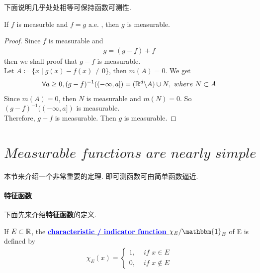 	\vspace{2em}
	下面说明几乎处处相等可保持函数可测性.
	\begin{proposition}
		If $f$ is measurble and $f = g$ a.e. , then $g$ is measurable.
		
		\vspace{2em}
		\begin{proof}
			Since $f$ is measurable and
			\begin{align}
				g = (g - f) + f
			\end{align}
			then we shall proof that $g - f$ is measurable.\\
			Let $A \coloneqq \{ x \mid g(x) - f(x) \neq 0 \}$, then $m(A) = 0$. We get
			\begin{align}
				\forall a \geq 0, (g - f)^{-1}((-\infty , a]) = (\mathbb{R}^d \backslash A) \cup N , \,\, where \,\, N \subset A
			\end{align}
			Since $m(A) = 0$, then $N$ is measurable and $m(N) = 0$. So $(g - f)^{-1}((-\infty , a])$ is measurable.\\
			Therefore, $g - f$ is measurable. Then $g$ is measurable.
		\end{proof}
	\end{proposition}

\newpage
\section{$Measurable \,\, functions \,\, are \,\, nearly \,\, simple$}
	本节来介绍一个非常重要的定理. 即可测函数可由简单函数逼近.

\paragraph{特征函数}
	下面先来介绍\textbf{特征函数}的定义.
	\begin{defn}\label{def 2.2.1}
		If $E \subset \mathbb{R}$, the \underline{\textcolor{blue}{\textbf{characteristic / indicator function $\chi_E / \mathbbm{1}_E$}}}  of E is defined by
		\begin{align}
			\chi_E (x) = 
			\begin{cases}
				1 , \,\, &if \,\, x \in E \\
				0 , &if \,\, x \notin E
			\end{cases}
		\end{align}
	\end{defn}

